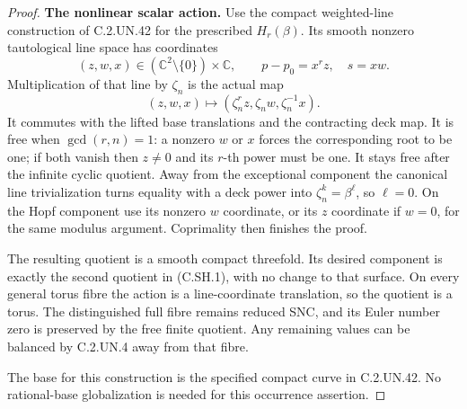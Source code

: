 \begin{proof}
\par\medskip\noindent\textbf{The nonlinear scalar action.}
Use the compact weighted-line construction of C.2.UN.42
for the prescribed $H_r(\beta)$. Its smooth nonzero
tautological line space has coordinates
\[
 (z,w,x)\in(\mathbb C^2\setminus\{0\})\times\mathbb C,
                   \qquad p-p_0=x^r z,\quad s=xw.
\tag{C.SH.12}
\]
Multiplication of that line by $\zeta_n$ is the actual map
\[
 (z,w,x)\longmapsto
       (\zeta_n^r z,\zeta_n w,\zeta_n^{-1}x).
\tag{C.SH.13}
\]
It commutes with the lifted base translations and the
contracting deck map. It is free when $\gcd(r,n)=1$:
a nonzero $w$ or $x$ forces the corresponding root to be
one; if both vanish then $z\ne0$ and its $r$-th power
must be one. It stays free after the infinite cyclic
quotient. Away from the exceptional component the
canonical line trivialization turns equality with a
deck power into $\zeta_n^k=\beta^\ell$, so $\ell=0$.
On the Hopf component use its nonzero $w$ coordinate,
or its $z$ coordinate if $w=0$, for the same modulus
argument. Coprimality then finishes the proof.

The resulting quotient is a smooth compact threefold.
Its desired component is exactly the second quotient
in (C.SH.1), with no change to that surface. On every
general torus fibre the action is a line-coordinate
translation, so the quotient is a torus. The distinguished
full fibre remains reduced SNC, and its Euler number
zero is preserved by the free finite quotient. Any
remaining values can be balanced by C.2.UN.4 away
from that fibre.

The base for this construction is the specified compact
curve in C.2.UN.42. No rational-base globalization is
needed for this occurrence assertion.
\end{proof}

